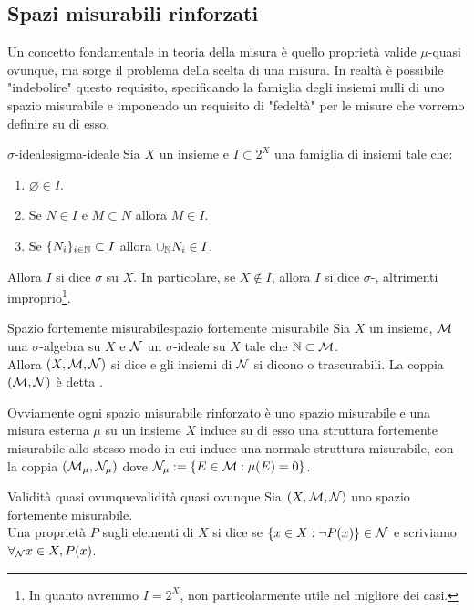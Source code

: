 \documentclass[openany]{book}
\begin{document}
\subsection{Spazi misurabili rinforzati}

Un concetto fondamentale in teoria della misura è quello proprietà valide $\mu$-quasi ovunque, ma sorge il problema della scelta di una misura. In realtà è possibile "indebolire" questo requisito, specificando la famiglia degli insiemi nulli di uno spazio misurabile e imponendo un requisito di "fedeltà" per le misure che vorremo definire su di esso.

\begin{definition}{$\sigma$-ideale}{sigma-ideale}
    Sia $X$ un insieme e $I \subset 2^X$ una famiglia di insiemi tale che:\begin{enumerate}
        \item $\varnothing \in I$.
        \item Se $N \in I$ e $M\subset N$ allora $M \in I$.
        \item Se $\{N_i\}_{i \in \mathbb{N}}\subset I$ allora $\cup_{\mathbb{N}} N_i \in I$.
    \end{enumerate}
    Allora $I$ si dice $\sigma$ su $X$. In particolare, se $X \notin I$, allora $I$ si dice $\sigma$-, altrimenti improprio\footnote{In quanto avremmo $I=2^X$, non particolarmente utile nel migliore dei casi.}.
\end{definition}

\begin{definition}{Spazio fortemente misurabile}{spazio fortemente misurabile}
    Sia $X$ un insieme, $\mathcal{M}$ una $\sigma$-algebra su $X$ e $\mathcal{N}$ un $\sigma$-ideale su $X$ tale che $\mathbb{N}\subset \mathcal{M}$.\\
    Allora $(X,\mathcal{M},\mathcal{N})$ si dice  e gli insiemi di $\mathcal{N}$ si dicono  o trascurabili. La coppia $(\mathcal{M},\mathcal{N})$ è detta .
\end{definition}

Ovviamente ogni spazio misurabile rinforzato è uno spazio misurabile e una misura esterna $\mu$ su un insieme $X$ induce su di esso una struttura fortemente misurabile allo stesso modo in cui induce una normale struttura misurabile, con la coppia $(\mathcal{M}_\mu, \mathcal{N}_\mu)$ dove $\mathcal{N}_\mu := \{E \in \mathcal{M} : \mu(E) = 0\}$.

\begin{definition}{Validità quasi ovunque}{validità quasi ovunque}
    Sia $(X,\mathcal{M},\mathcal{N})$ uno spazio fortemente misurabile.\\
    Una proprietà $P$ sugli elementi di $X$ si dice  se $\{x \in X : \neg P(x)\}\in \mathcal{N}$ e scriviamo $\forall_{\mathcal{N}} x \in X, P(x)$.
\end{definition}
\end{document}
